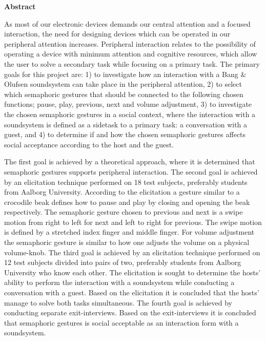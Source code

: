 \begin{center}
	\textbf{{\huge Abstract}}
\end{center}
%
As most of our electronic devices demands our central attention and a focused interaction, the need for designing devices which can be operated in our peripheral attention increases. Peripheral interaction relates to the possibility of operating a device with minimum attention and cognitive resources, which allow the user to solve a secondary task while focusing on a primary task. The primary goals for this project are: 1) to investigate how an interaction with a Bang $\&$ Olufsen soundsystem can take place in the peripheral attention, 2) to select which semaphoric gestures that should be connected to the following chosen functions; pause, play, previous, next and volume adjustment, 3) to investigate the chosen semaphoric gestures in a social context, where the interaction with a soundsystem is defined as a sidetask to a primary task: a conversation with a guest, and 4) to determine if and how the chosen semaphoric gestures affects social acceptance according to the host and the guest.            

The first goal is achieved by a theoretical approach, where it is determined that semaphoric gestures supports peripheral interaction. The second goal is achieved by an elicitation technique performed on 18 test subjects, preferably students from Aalborg University. According to the elicitation a gesture similar to a crocodile beak defines how to pause and play by closing and opening the beak respectively. The semaphoric gesture chosen to previous and next is a swipe motion from right to left for next and left to right for previous. The swipe motion is defined by a stretched index finger and middle finger. For volume adjustment the semaphoric gesture is similar to how one adjusts the volume on a physical volume-knob. The third goal is achieved by an elicitation technique performed on 12 test subjects divided into pairs of two, preferably students from Aalborg University who know each other. The elicitation is sought to determine the hosts' ability to perform the interaction with a soundsystem while conducting a conversation with a guest. Based on the elicitation it is concluded that the hosts' manage to solve both tasks simultaneous. The fourth goal is achieved by conducting separate exit-interviews. Based on the exit-interviews it is concluded that semaphoric gestures is social acceptable as an interaction form with a soundsystem.